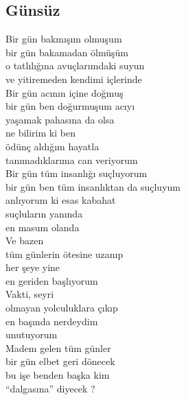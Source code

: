 \subsection{Günsüz}

Bir gün bakmışım olmuşum \\
bir gün bakamadan ölmüşüm \\
o tatlılığına avuçlarımdaki suyun \\
ve yitiremeden kendimi içlerinde \\

Bir gün acının içine doğmuş \\
bir gün ben doğurmuşum acıyı \\
yaşamak pahasına da olsa \\
ne bilirim ki ben \\
ödünç aldığım hayatla \\
tanımadıklarıma can veriyorum \\

Bir gün tüm insanlığı suçluyorum \\
bir gün ben tüm insanlıktan da suçluyum \\
anlıyorum ki esas kabahat \\
suçluların yanında \\
en masum olanda \\

Ve bazen \\
tüm günlerin ötesine uzanıp \\
her şeye yine \\
en geriden başlıyorum \\

Vakti, seyri \\
olmayan yolculuklara çıkıp \\
en başında nerdeydim \\
unutuyorum \\

Madem gelen tüm günler \\
bir gün elbet geri dönecek \\
bu işe benden başka kim \\
“dalgasına” diyecek ? \\